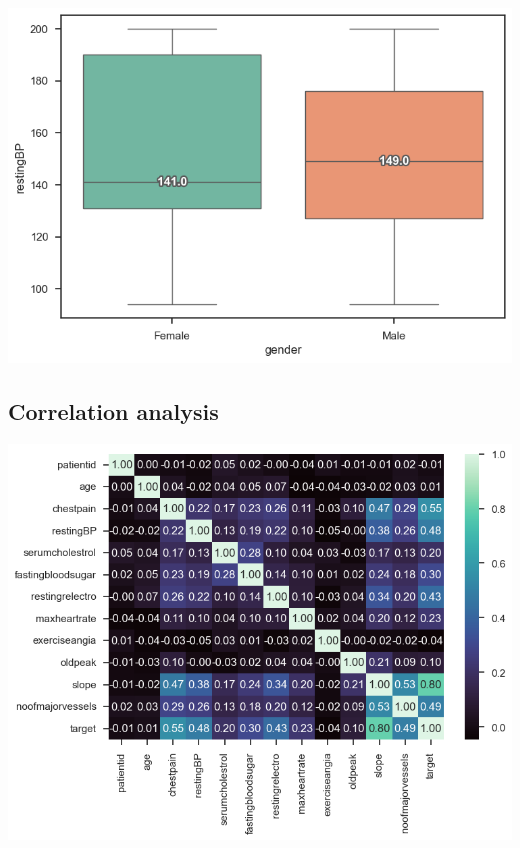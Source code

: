 \includegraphics[width=0.8\linewidth]{media/boxplot-08-gender-bp.png}

\subsection{Correlation analysis}

\includegraphics[width=0.8\linewidth]{media/correlation-matrix.png}